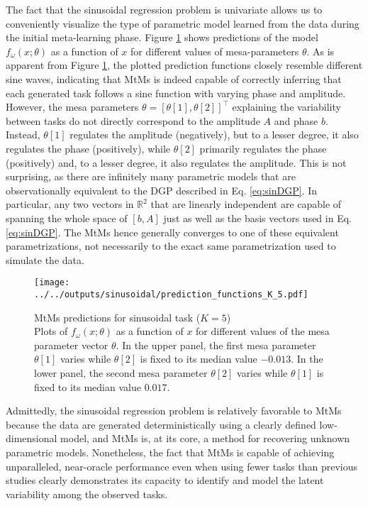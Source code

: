 \documentclass[3p,times,twocolumn]{elsarticle}
\begin{document}
The fact that the sinusoidal regression problem is univariate allows us to conveniently visualize the type of parametric model learned from the data during the initial meta-learning phase.
Figure \ref{fig:sinPredictionFunctions} shows predictions of the model $f_{\omega}(x;\theta)$ as a function of $x$ for different values of mesa-parameters $\theta$.
As is apparent from Figure \ref{fig:sinPredictionFunctions}, the plotted prediction functions closely resemble different sine waves, indicating that MtMs is indeed capable of correctly inferring that each generated task follows a sine function with varying phase and amplitude.
However, the mesa parameters $\theta=[\theta[1],\theta[2]]^{\top} $ explaining the variability between tasks do not directly correspond to the amplitude $A$ and phase $b$.
Instead, $\theta[1]$ regulates the amplitude (negatively), but to a lesser degree, it also regulates the phase (positively), while $\theta[2]$ primarily regulates the phase (positively) and, to a lesser degree, it also regulates the amplitude.
This is not surprising, as there are infinitely many parametric models that are observationally equivalent to the DGP described in Eq. \ref{eq:sinDGP}.
In particular, any two vectors in $\mathbb{R}^2$ that are linearly independent are capable of spanning the whole space of $[b,A]$ just as well as the basis vectors used in Eq. \ref{eq:sinDGP}.
The MtMs hence generally converges to one of these equivalent parametrizations, not necessarily to the exact same parametrization used to simulate the data.

\begin{figure}[!htbp]
    \centering
    \texttt{[image: ../../outputs/sinusoidal/prediction\_functions\_K\_5.pdf]}
    \caption{
        MtMs predictions for sinusoidal task ($K=5$)\\
        Plots of $f_{\omega}(x;\theta)$ as a function of $x$ for different values of the mesa parameter vector $\theta$.
        In the upper panel, the first mesa parameter $\theta[1] $ varies while $\theta[2] $ is fixed to its median value $-0.013$.
        In the lower panel, the second mesa parameter $\theta[2] $ varies while $\theta[1] $ is fixed to its median value $0.017$.
    }
    \label{fig:sinPredictionFunctions}
\end{figure}

Admittedly, the sinusoidal regression problem is relatively favorable to MtMs because the data are generated deterministically using a clearly defined low-dimensional model, and MtMs is, at its core, a method for recovering unknown parametric models.
Nonetheless, the fact that MtMs is capable of achieving unparalleled, near-oracle performance even when using fewer tasks than previous studies clearly demonstrates its capacity to identify and model the latent variability among the observed tasks.
\end{document}
